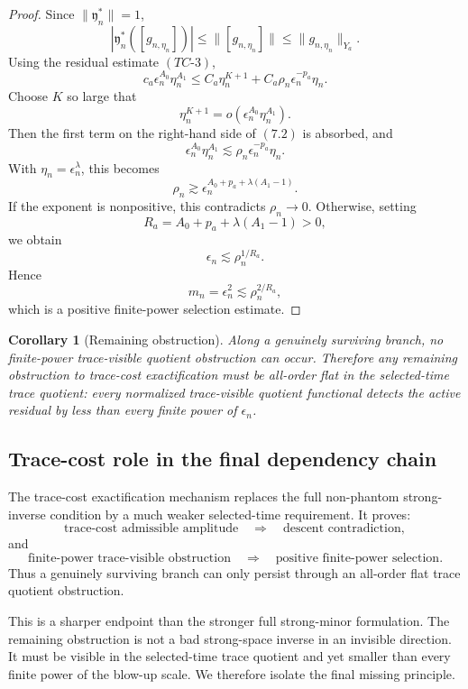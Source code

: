 \documentclass[11pt]{article}
\numberwithin{equation}{section}
\theoremstyle{plain}
\newtheorem{corollary}{Corollary}[section]
\theoremstyle{definition}
\theoremstyle{remark}
\begin{document}
\begin{proof}
Since \(\|\mathfrak y_n^*\|=1\),
\[
        |\mathfrak y_n^*([g_{n,\eta_n}])|
        \le
        \|[g_{n,\eta_n}]\|
        \le
        \|g_{n,\eta_n}\|_{Y_a}.
\]
Using the residual estimate \((TC\text{-}3)\),
\[
        c_a\epsilon_n^{A_0}\eta_n^{A_1}
        \le
        C_a\eta_n^{K+1}
        +
        C_a\rho_n\epsilon_n^{-p_a}\eta_n.
        \tag{7.2}
\]
Choose \(K\) so large that
\[
        \eta_n^{K+1}=o(\epsilon_n^{A_0}\eta_n^{A_1}).
\]
Then the first term on the right-hand side of \((7.2)\) is absorbed, and
\[
        \epsilon_n^{A_0}\eta_n^{A_1}
        \lesssim
        \rho_n\epsilon_n^{-p_a}\eta_n.
\]
With \(\eta_n=\epsilon_n^\lambda\), this becomes
\[
        \rho_n
        \gtrsim
        \epsilon_n^{A_0+p_a+\lambda(A_1-1)}.
\]
If the exponent is nonpositive, this contradicts \(\rho_n\to0\).  Otherwise, setting
\[
        R_a=A_0+p_a+\lambda(A_1-1)>0,
\]
we obtain
\[
        \epsilon_n\lesssim \rho_n^{1/R_a}.
\]
Hence
\[
        m_n=\epsilon_n^2\lesssim \rho_n^{2/R_a},
\]
which is a positive finite-power selection estimate.
\end{proof}

\begin{corollary}[Remaining obstruction]
Along a genuinely surviving branch, no finite-power trace-visible quotient obstruction can occur.  Therefore any remaining obstruction to trace-cost exactification must be all-order flat in the selected-time trace quotient: every normalized trace-visible quotient functional detects the active residual by less than every finite power of \(\epsilon_n\).
\end{corollary}

\subsection{Trace-cost role in the final dependency chain}

The trace-cost exactification mechanism replaces the full non-phantom strong-inverse condition by a much weaker selected-time requirement.  It proves:
\[
        \text{trace-cost admissible amplitude}
        \quad\Longrightarrow\quad
        \text{descent contradiction},
\]
and
\[
        \text{finite-power trace-visible obstruction}
        \quad\Longrightarrow\quad
        \text{positive finite-power selection}.
\]
Thus a genuinely surviving branch can only persist through an all-order flat trace quotient obstruction.

This is a sharper endpoint than the stronger full strong-minor formulation.  The remaining obstruction is not a bad strong-space inverse in an invisible direction.  It must be visible in the selected-time trace quotient and yet smaller than every finite power of the blow-up scale.  We therefore isolate the final missing principle.
\end{document}
